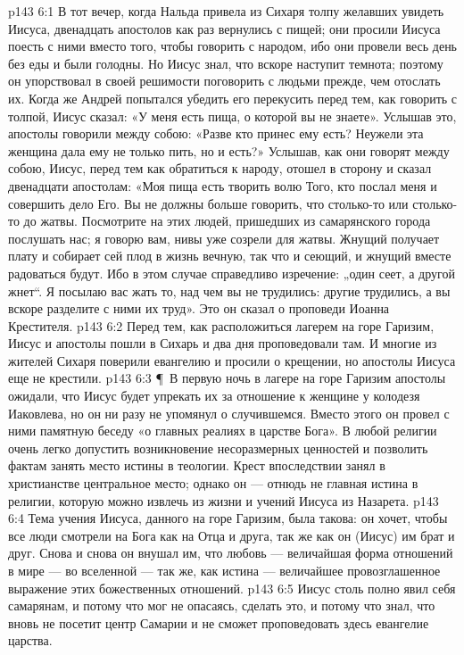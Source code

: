 \vs p143 6:1 В тот вечер, когда Нальда привела из Сихаря толпу желавших увидеть Иисуса, двенадцать апостолов как раз вернулись с пищей; они просили Иисуса поесть с ними вместо того, чтобы говорить с народом, ибо они провели весь день без еды и были голодны. Но Иисус знал, что вскоре наступит темнота; поэтому он упорствовал в своей решимости поговорить с людьми прежде, чем отослать их. Когда же Андрей попытался убедить его перекусить перед тем, как говорить с толпой, Иисус сказал: «У меня есть пища, о которой вы не знаете». Услышав это, апостолы говорили между собою: «Разве кто принес ему есть? Неужели эта женщина дала ему не только пить, но и есть?» Услышав, как они говорят между собою, Иисус, перед тем как обратиться к народу, отошел в сторону и сказал двенадцати апостолам: «Моя пища есть творить волю Того, кто послал меня и совершить дело Его. Вы не должны больше говорить, что столько\hyp{}то или столько\hyp{}то до жатвы. Посмотрите на этих людей, пришедших из самарянского города послушать нас; я говорю вам, нивы уже созрели для жатвы. Жнущий получает плату и собирает сей плод в жизнь вечную, так что и сеющий, и жнущий вместе радоваться будут. Ибо в этом случае справедливо изречение: „один сеет, а другой жнет“. Я посылаю вас жать то, над чем вы не трудились: другие трудились, а вы вскоре разделите с ними их труд». Это он сказал о проповеди Иоанна Крестителя.
\vs p143 6:2 Перед тем, как расположиться лагерем на горе Гаризим, Иисус и апостолы пошли в Сихарь и два дня проповедовали там. И многие из жителей Сихаря поверили евангелию и просили о крещении, но апостолы Иисуса еще не крестили.
\vs p143 6:3 \P\ В первую ночь в лагере на горе Гаризим апостолы ожидали, что Иисус будет упрекать их за отношение к женщине у колодезя Иаковлева, но он ни разу не упомянул о случившемся. Вместо этого он провел с ними памятную беседу «о главных реалиях в царстве Бога». В любой религии очень легко допустить возникновение несоразмерных ценностей и позволить фактам занять место истины в теологии. Крест впоследствии занял в христианстве центральное место; однако он --- отнюдь не главная истина в религии, которую можно извлечь из жизни и учений Иисуса из Назарета.
\vs p143 6:4 Тема учения Иисуса, данного на горе Гаризим, была такова: он хочет, чтобы все люди смотрели на Бога как на Отца и друга, так же как он (Иисус) им брат и друг. Снова и снова он внушал им, что любовь --- величайшая форма отношений в мире --- во вселенной --- так же, как истина --- величайшее провозглашенное выражение этих божественных отношений.
\vs p143 6:5 Иисус столь полно явил себя самарянам, и потому что мог не опасаясь, сделать это, и потому что знал, что вновь не посетит центр Самарии и не сможет проповедовать здесь евангелие царства.
